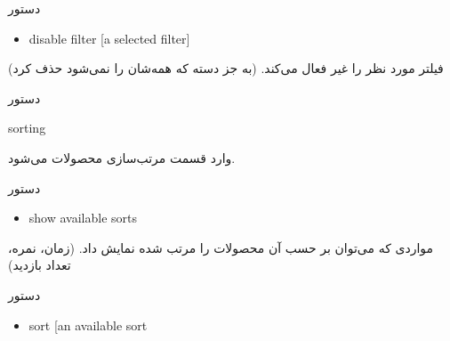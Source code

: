 \documentclass[]{article}
\begin{document}
\begin{mybox}[colback=brilliantlavender]{دستور}

\begin{latin}

\begin{itemize}[label = {$\Rightarrow$}]

\item
disable filter [a selected filter]

\end{itemize}

\end{latin}

\end{mybox}

فیلتر مورد نظر را غیر فعال می‌کند. (به جز دسته که همه‌شان را نمی‌شود حذف کرد)

\hrulefill

\begin{mybox}[colback=yellow]{دستور}

\begin{latin}

sorting

\end{latin}

\end{mybox}

وارد قسمت مرتب‌سازی محصولات می‌شود.



\begin{mybox}[colback=brilliantlavender]{دستور}

\begin{latin}

\begin{itemize}[label = {$\Rightarrow$}]

\item
show available sorts

\end{itemize}

\end{latin}

\end{mybox}

مواردی که می‌توان بر حسب آن محصولات را مرتب شده نمایش داد. (زمان، نمره، تعداد بازدید)



\begin{mybox}[colback=brilliantlavender]{دستور}

\begin{latin}

\begin{itemize}[label = {$\Rightarrow$}]

\item
sort [an available sort

\end{itemize}

\end{latin}

\end{mybox}
\end{document}
